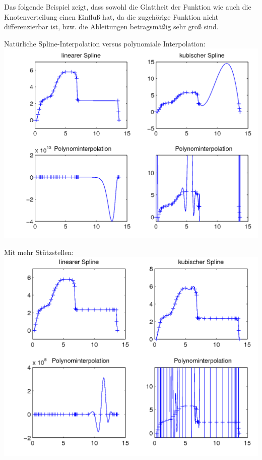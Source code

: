 \begin{Bspe}[Laster]\label{5.2.20}
Das folgende Beispiel zeigt,
dass sowohl die Glattheit der Funktion
wie auch die Knotenverteilung einen Einfluß hat,
da die zugehörige Funktion nicht differenzierbar ist,
bzw. die Ableitungen betragsmäßig sehr groß sind.

Natürliche Spline-Interpolation
versus polynomiale Interpolation:\\
{\centering
\includegraphics[width=\linewidth]{images/laster1.png}
}

Mit mehr Stützstellen:\\
{\centering
\includegraphics[width=\linewidth]{images/laster2.png} 
}
\end{Bspe}

